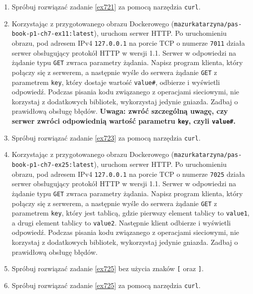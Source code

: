 \documentclass{article}
\begin{document}
\begin{enumerate}[label=\textbf{7.\arabic*}]
\item Spróbuj rozwiązać zadanie \ref{ex721} za pomocą narzędzia \texttt{curl}.  
\item \label{ex723} Korzystając z przygotowanego obrazu Dockerowego (\texttt{mazurkatarzyna/pas-book-p1-ch7-ex11:latest}), uruchom serwer HTTP.  Po uruchomieniu obrazu, pod adresem IPv4 \texttt{127.0.0.1} na porcie TCP o numerze \texttt{7011} działa serwer obsługujący protokół HTTP w wersji 1.1. Serwer w odpowiedzi na żądanie typu \texttt{GET} zwraca parametry żądania. Napisz program klienta, który połączy się z serwerem, a następnie wyśle do serwera żądanie \texttt{GET} z parametrem \texttt{key}, który dostaje wartość \texttt{value\#}, odbierze i wyświetli odpowiedź. Podczas pisania kodu związanego z operacjami sieciowymi, nie korzystaj z dodatkowych bibliotek, wykorzystaj jedynie gniazda. Zadbaj o prawidłową obsługę błędów. \textbf{Uwaga: zwróć szczególną uwagę, czy serwer zwróci odpowiednią wartość parametru \texttt{key}, czyli \texttt{value\#}.} \
\item Spróbuj rozwiązać zadanie \ref{ex723} za pomocą narzędzia \texttt{curl}.  
\item \label{ex725} Korzystając z przygotowanego obrazu Dockerowego (\texttt{mazurkatarzyna/pas-book-p1-ch7-ex25:latest}), uruchom serwer HTTP.  Po uruchomieniu obrazu, pod adresem IPv4 \texttt{127.0.0.1} na porcie TCP o numerze \texttt{7025} działa serwer obsługujący protokół HTTP w wersji 1.1. Serwer w odpowiedzi na żądanie typu \texttt{GET} zwraca parametry żądania. Napisz program klienta, który połączy się z serwerem, a następnie wyśle do serwera żądanie \texttt{GET} z parametrem \texttt{key}, który jest tablicą, gdzie pierwszy element tablicy to \texttt{value1}, a drugi element tablicy to \texttt{value2}.  Następnie klient odbierze i wyświetli odpowiedź. Podczas pisania kodu związanego z operacjami sieciowymi, nie korzystaj z dodatkowych bibliotek, wykorzystaj jedynie gniazda. Zadbaj o prawidłową obsługę błędów.  
\item Spróbuj rozwiązać zadanie \ref{ex725} bez użycia znaków \texttt{[} oraz \texttt{]}.
\item Spróbuj rozwiązać zadanie \ref{ex725} za pomocą narzędzia \texttt{curl}.  


\end{enumerate}
\end{document}
